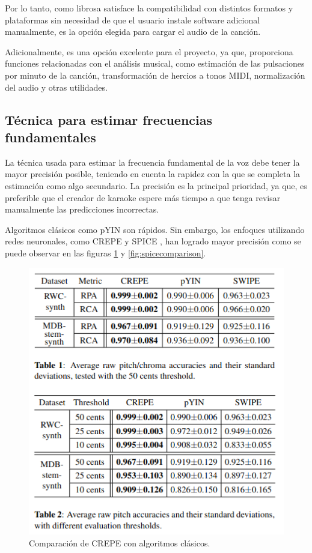 Por lo tanto, como librosa satisface la compatibilidad con distintos formatos y plataformas sin necesidad de que el usuario instale software adicional manualmente, es la opción elegida para cargar el audio de la canción.

Adicionalmente, es una opción excelente para el proyecto, ya que, proporciona funciones relacionadas con el análisis musical, como estimación de las pulsaciones por minuto de la canción, transformación de hercios a tonos MIDI, normalización del audio y otras utilidades.

\subsection{Técnica para estimar frecuencias fundamentales}

La técnica usada para estimar la frecuencia fundamental de la voz debe tener la mayor precisión posible, teniendo en cuenta la rapidez con la que se completa la estimación como algo secundario. La precisión es la principal prioridad, ya que, es preferible que el creador de karaoke espere más tiempo a que tenga revisar manualmente las predicciones incorrectas.

Algoritmos clásicos como pYIN \cite{pYIN} son rápidos. Sin embargo, los enfoques utilizando redes neuronales, como CREPE \cite{CREPE} y SPICE \cite{SPICE}, han logrado mayor precisión como se puede observar en las figuras \ref{fig:crepecomparison} y \ref{fig:spicecomparison}.

\begin{figure}[h!]
	\centering
	\includegraphics[width=0.7\linewidth]{logos/crepe_comparison}
	\caption{Comparación de CREPE con algoritmos clásicos\protect\footnotemark.}
	\label{fig:crepecomparison}
\end{figure}


